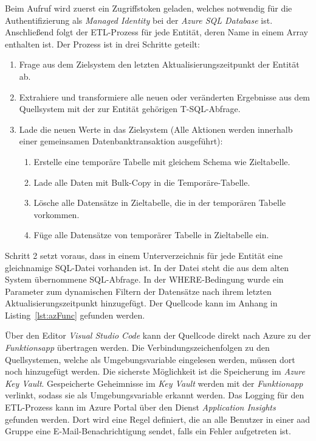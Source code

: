 Beim Aufruf wird zuerst ein Zugriffstoken geladen, welches notwendig für die Authentifizierung als \textit{Managed Identity} bei der \textit{Azure SQL Database} ist. Anschließend folgt der ETL-Prozess für jede Entität, deren Name in einem Array enthalten ist. Der Prozess ist in drei Schritte geteilt:
\begin{enumerate}
\item Frage aus dem Zielsystem den letzten Aktualisierungszeitpunkt der Entität ab.
\item Extrahiere und transformiere alle neuen oder veränderten Ergebnisse aus dem Quellsystem mit der zur Entität gehörigen T-SQL-Abfrage.
\item Lade die neuen Werte in das Zielsystem (Alle Aktionen werden innerhalb einer gemeinsamen Datenbanktransaktion ausgeführt):
    \begin{enumerate}
    \item Erstelle eine temporäre Tabelle mit gleichem Schema wie Zieltabelle.
    \item Lade alle Daten mit Bulk-Copy in die Temporäre-Tabelle.
    \item Lösche alle Datensätze in Zieltabelle, die in der temporären Tabelle vorkommen.
    \item Füge alle Datensätze von temporärer Tabelle in Zieltabelle ein.
    \end{enumerate}
\end{enumerate}
Schritt 2 setzt voraus, dass in einem Unterverzeichnis für jede Entität eine gleichnamige SQL-Datei vorhanden ist. In der Datei steht die aus dem alten System übernommene SQL-Abfrage. In der WHERE-Bedingung wurde ein Parameter zum dynamischen Filtern der Datensätze nach ihrem letzten Aktualisierungszeitpunkt hinzugefügt. Der Quellcode kann im Anhang in Listing~\ref{lst:azFunc} gefunden werden.

Über den Editor \textit{Visual Studio Code} kann der Quellcode direkt nach Azure zu der \textit{Funktionsapp} übertragen werden. Die Verbindungszeichenfolgen zu den Quellsystemen, welche als Umgebungsvariable eingelesen werden, müssen dort noch hinzugefügt werden. Die sicherste Möglichkeit ist die Speicherung im \textit{Azure Key Vault}. Gespeicherte Geheimnisse im \textit{Key Vault} werden mit der \textit{Funktionapp} verlinkt, sodass sie als Umgebungsvariable erkannt werden. Das Logging für den ETL-Prozess kann im Azure Portal über den Dienst \textit{Application Insights} gefunden werden. Dort wird eine Regel definiert, die an alle Benutzer in einer \ac{aad} Gruppe eine E-Mail-Benachrichtigung sendet, falls ein Fehler aufgetreten ist.

